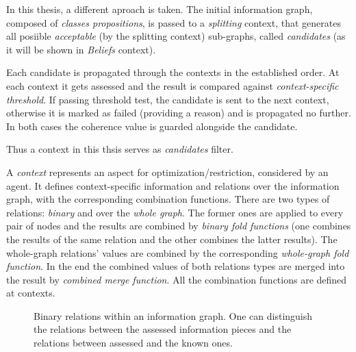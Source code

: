 In this thesis, a different aproach is taken. The initial information graph,
composed of \emph{classes propositions}, is passed to a \emph{splitting} context,
that generates all posiible \emph{acceptable} (by the splitting context) sub-graphs,
called \emph{candidates} (as it will be shown in \emph{Beliefs} context).

Each candidate is propagated through the contexts in the established
order. At each context it gets assessed and the result is compared
against \emph{context-specific threshold}. If passing threshold test,
the candidate is sent to the next context, otherwise it is marked as failed
(providing a reason) and is propagated no further. In both cases the coherence
value is guarded alongside the candidate.

Thus a context in this thsis serves as \emph{candidates} filter.
\medskip

\noindent
A \emph{context} represents an aspect for optimization/restriction, considered
by an agent. It defines context-specific information and relations over the
information graph, with the corresponding combination functions. There are
two types of relations: \emph{binary} and over the \emph{whole graph}. The former ones
are applied to every pair of nodes and the results are combined by
\emph{binary fold functions} (one combines the results of the same relation
and the other combines the latter results). The whole-graph relations' values are
combined by the corresponding \emph{whole-graph fold function}. In the end the
combined values of both relations types are merged into the result by
\emph{combined merge function}. All the combination functions are defined at
contexts.

\begin{figure}[h]
  \centering
  \fbox{  }
  \caption{Binary relations within an information graph. One can
           distinguish the relations between the assessed information pieces
           and the relations between assessed and the known ones.
          }
\end{figure}




%
